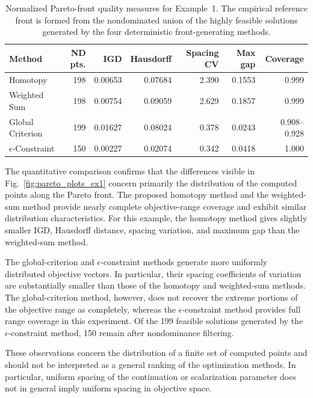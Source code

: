 \documentclass[11pt,pdflatex,sn-mathphys-ay]{sn-jnl}%
\theoremstyle{definition}
\theoremstyle{thmstyleone}%
\theoremstyle{thmstyletwo}%
\theoremstyle{thmstylethree}%
\newcommand{\add}[1]{\textcolor{revisionblue}{#1}}
\begin{document}
	
	\begin{table}[h!]
		\centering
		\caption{Normalized Pareto-front quality measures for Example~1.
			The empirical reference front is formed from the nondominated union
			of the highly feasible solutions generated by the four deterministic
			front-generating methods.}
		\label{tab:front-quality}
		\begin{tabular}{lrrrrrr}
			\hline
			Method & ND pts. & IGD & Hausdorff & Spacing CV & Max gap & Coverage \\
			\hline
			Homotopy
			& 198 & 0.00653 & 0.07684 & 2.390 & 0.1553 & 0.999 \\
			
			Weighted Sum
			& 198 & 0.00754 & 0.09059 & 2.629 & 0.1857 & 0.999 \\
			
			Global Criterion
			& 199 & 0.01627 & 0.08024 & 0.378 & 0.0243 & 0.908--0.928 \\
			
			$\epsilon$-Constraint
			& 150 & 0.00227 & 0.02074 & 0.342 & 0.0418 & 1.000 \\
			\hline
		\end{tabular}
	\end{table}
	
	
	
	\add{The quantitative comparison confirms that the differences visible in
		Fig.~\ref{fig:pareto_plots_ex1} concern primarily the distribution of the
		computed points along the Pareto front. The proposed homotopy method
		and the weighted-sum method provide nearly complete objective-range
		coverage and exhibit similar distribution characteristics. For this
		example, the homotopy method gives slightly smaller IGD, Hausdorff
		distance, spacing variation, and maximum gap than the weighted-sum
		method.}
	
	\add{The global-criterion and $\epsilon$-constraint methods generate more
		uniformly distributed objective vectors. In particular, their spacing
		coefficients of variation are substantially smaller than those of the
		homotopy and weighted-sum methods. The global-criterion method,
		however, does not recover the extreme portions of the objective range
		as completely, whereas the $\epsilon$-constraint method provides full
		range coverage in this experiment. Of the 199 feasible solutions
		generated by the $\epsilon$-constraint method, 150 remain after
		nondominance filtering.}
	
	\add{These observations concern the distribution of a finite set of
		computed points and should not be interpreted as a general ranking of
		the optimization methods. In particular, uniform spacing of the
		continuation or scalarization parameter does not in general imply
		uniform spacing in objective space.}
	
\end{document}
